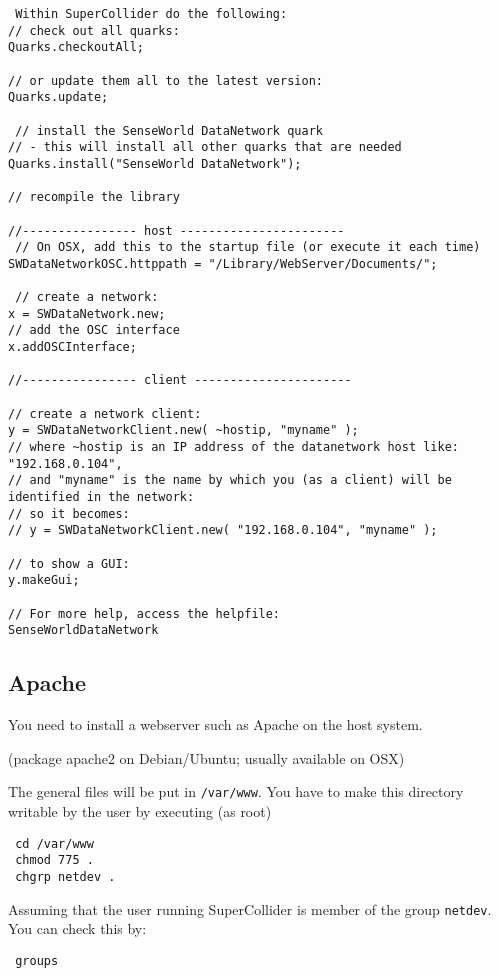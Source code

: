 \documentclass[letterpaper,10pt]{article}
\begin{document}
\begin{verbatim}
 Within SuperCollider do the following:
// check out all quarks:
Quarks.checkoutAll;

// or update them all to the latest version:
Quarks.update;

 // install the SenseWorld DataNetwork quark
// - this will install all other quarks that are needed
Quarks.install("SenseWorld DataNetwork");

// recompile the library 

//---------------- host -----------------------
 // On OSX, add this to the startup file (or execute it each time)
SWDataNetworkOSC.httppath = "/Library/WebServer/Documents/";

 // create a network:
x = SWDataNetwork.new;
// add the OSC interface
x.addOSCInterface;

//---------------- client ----------------------

// create a network client:
y = SWDataNetworkClient.new( ~hostip, "myname" );
// where ~hostip is an IP address of the datanetwork host like: "192.168.0.104",
// and "myname" is the name by which you (as a client) will be identified in the network:
// so it becomes:
// y = SWDataNetworkClient.new( "192.168.0.104", "myname" );

// to show a GUI:
y.makeGui;
 
// For more help, access the helpfile:
SenseWorldDataNetwork
\end{verbatim}


\subsection{Apache}

You need to install a webserver such as Apache on the host system.

(package apache2 on Debian/Ubuntu; usually available on OSX)

The general files will be put in \verb|/var/www|.
You have to make this directory writable by the user by executing (as root)

\begin{verbatim}
 cd /var/www
 chmod 775 .
 chgrp netdev .
\end{verbatim}

Assuming that the user running SuperCollider is member of the group \verb|netdev|. You can check this by:

\begin{verbatim}
 groups
\end{verbatim}
\end{document}
